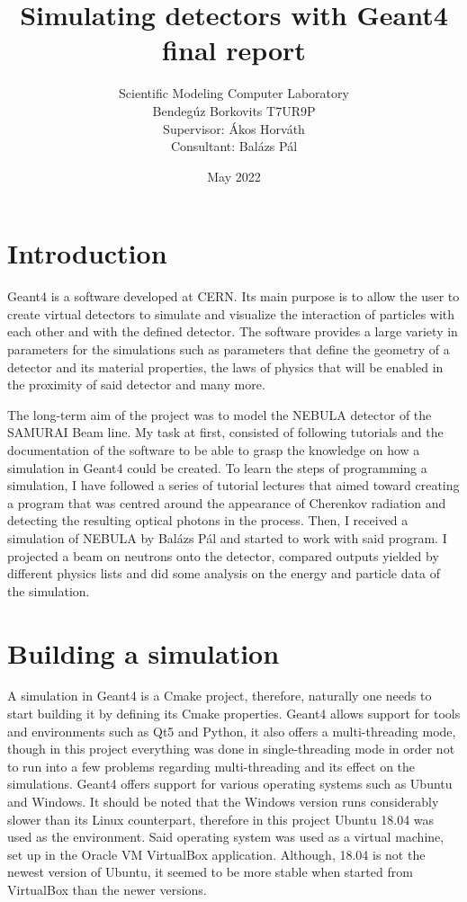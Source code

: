 \documentclass[12pt,twocolumn]{article}
\title{Simulating detectors with Geant4 final report}
\author{Scientific Modeling Computer Laboratory\\Bendegúz Borkovits T7UR9P\\Supervisor: Ákos Horváth\\Consultant: Balázs Pál}
\date{May 2022}
\begin{document}
\maketitle

\section{Introduction}

Geant4 is a software developed at CERN. Its main purpose is to allow the user to create virtual detectors to simulate and visualize the interaction of particles with each other and with the defined detector. The software provides a large variety in parameters for the simulations such as parameters that define the geometry of a detector and its material properties, the laws of physics that will be enabled in the proximity of said detector and many more.

The long-term aim of the project was to model the NEBULA detector of the SAMURAI Beam line. My task at first, consisted of following tutorials \cite{youtube} and the documentation \cite{geant} of the software to be able to grasp the knowledge on how a simulation in Geant4 could be created. To learn the steps of programming a simulation, I have followed a series of tutorial lectures that aimed toward creating a program that was centred around the appearance of Cherenkov radiation and detecting the resulting optical photons in the process. Then, I received a simulation of NEBULA by Balázs Pál and started to work with said program. I projected a beam on neutrons onto the detector, compared outputs yielded by different physics lists and did some analysis on the energy and particle data of the simulation.

\section{Building a simulation}

A simulation in Geant4 is a Cmake project, therefore, naturally one needs to start building it by defining its Cmake properties. Geant4 allows support for tools and environments such as Qt5 and Python, it also offers a multi-threading mode, though in this project everything was done in single-threading mode in order not to run into a few problems regarding multi-threading and its effect on the simulations. Geant4 offers support for various operating systems such as Ubuntu and Windows. It should be noted that the Windows version runs considerably slower than its Linux counterpart, therefore in this project Ubuntu 18.04 was used as the environment. Said operating system was used as a virtual machine, set up in the Oracle VM VirtualBox application. Although, 18.04 is not the newest version of Ubuntu, it seemed to be more stable when started from VirtualBox than the newer versions.
\end{document}
